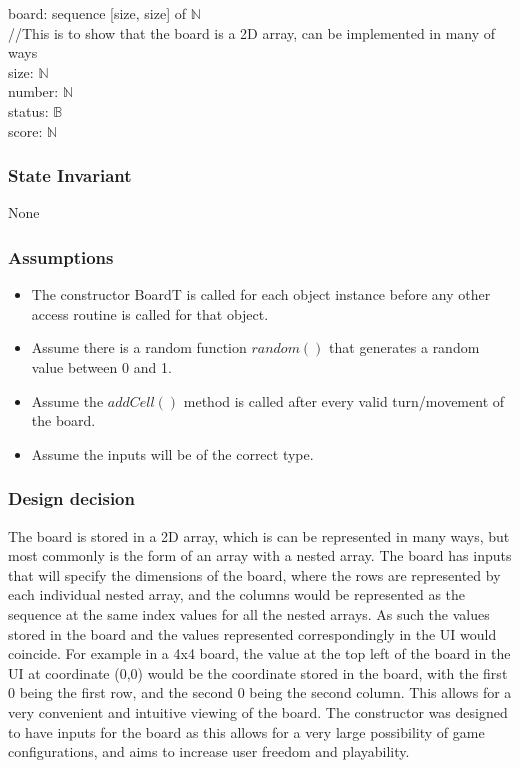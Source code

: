 \documentclass[12pt]{article}
\begin{document}
board: sequence [size, size] of $\mathbb{N}$ \\//This is to show that the board is a 2D array, can be implemented in many of ways\\
size: $\mathbb{N}$\\
number: $\mathbb{N}$\\
status: $\mathbb{B}$ \\
score: $\mathbb{N}$

\subsubsection* {State Invariant}

None

\subsubsection* {Assumptions}

\begin{itemize}
  \item The constructor BoardT is called for each object instance before any other access routine
  is called for that object.
  \item Assume there is a random function $random()$ that generates a random value between 0 and 1.
  \item Assume the $addCell()$ method is called after every valid turn/movement of the board.
  \item Assume the inputs will be of the correct type.
\end{itemize}

\subsubsection* {Design decision}

The board is stored in a 2D array, which is can be represented in many ways, but most commonly is the form of an array with a nested array. The board has inputs that will specify the dimensions of the board, where the rows are represented by each individual nested array, and the columns would be represented as the sequence at the same index values for all the nested arrays. As such the values stored in the board and the values represented correspondingly in the UI would coincide. For example in a 4x4 board, the value at the top left of the board in the UI at coordinate (0,0) would be the coordinate stored in the board, with the first 0 being the first row, and the second 0 being the second column. This allows for a very convenient and intuitive viewing of the board. The constructor was designed to have inputs for the board as this allows for a very large possibility of game configurations, and aims to increase user freedom and playability.
\end{document}
